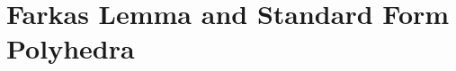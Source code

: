 \documentclass[main]{subfiles}
\begin{document}

\section{Farkas Lemma and Standard Form Polyhedra}
\end{document}
